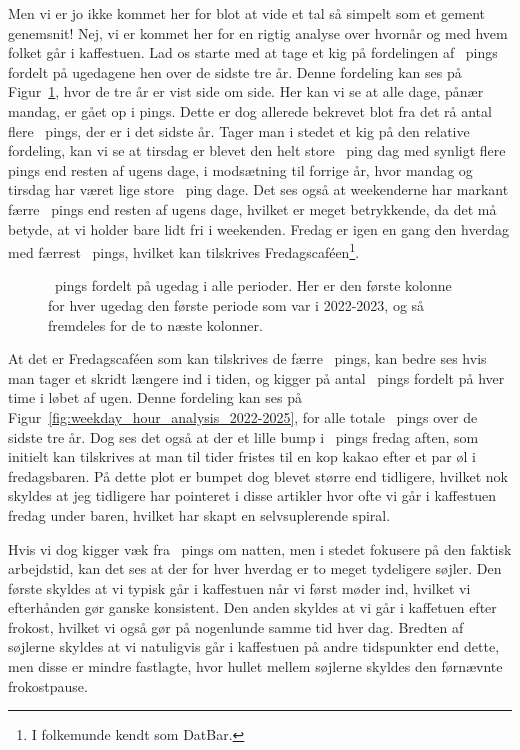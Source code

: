\begin{article}
Men vi er jo ikke kommet her for blot at vide et tal så simpelt som et gement genemsnit! Nej, vi er kommet her for en rigtig analyse over hvornår og med hvem folket går i kaffestuen.
Lad os starte med at tage et kig på fordelingen af \coffee\ pings fordelt på ugedagene hen over de sidste tre år. Denne fordeling kan ses på Figur~\ref{fig:weekday_analysis_multi}, hvor de tre år er vist side om side.
Her kan vi se at alle dage, pånær mandag, er gået op i pings. Dette er dog allerede bekrevet blot fra det
rå antal flere \coffee\ pings, der er i det sidste år.
Tager man i stedet et kig på den relative fordeling, kan vi se at tirsdag er blevet den helt store \coffee\ ping dag med synligt flere pings end resten af ugens dage, i modsætning til forrige år, hvor mandag og tirsdag har været lige store \coffee\ ping dage.
Det ses også at weekenderne har markant færre \coffee\ pings end resten af ugens dage, hvilket er meget betrykkende, da det må betyde, at vi holder bare lidt fri i weekenden.
Fredag er igen en gang den hverdag med færrest \coffee\ pings, hvilket kan tilskrives Fredagscaféen\footnote{I folkemunde kendt som DatBar.}.

\begin{figure}[H]
	\centering
	\resizebox{\columnwidth}{!}{}
	\vspace{-25pt}
	\caption{\protect\coffee\ pings fordelt på ugedag i alle perioder. Her er den første kolonne for hver ugedag den første periode som var i 2022-2023, og så fremdeles for de to næste kolonner.}
	\label{fig:weekday_analysis_multi}
\end{figure}

At det er Fredagscaféen som kan tilskrives de færre \coffee\ pings, kan bedre ses hvis man tager et skridt længere ind i tiden, og kigger på antal \coffee\ pings fordelt på hver time i løbet af ugen. Denne fordeling kan ses på Figur~\ref{fig:weekday_hour_analysis_2022-2025}, for alle totale \coffee\ pings over de sidste tre år.
Dog ses det også at der et lille bump i \coffee\ pings fredag aften, som initielt kan tilskrives at man til tider fristes til en kop kakao efter et par øl i fredagsbaren. På dette plot er bumpet dog blevet større end tidligere, hvilket nok skyldes at jeg tidligere har pointeret i disse artikler hvor ofte vi går i kaffestuen fredag under baren, hvilket har skapt en selvsuplerende spiral.

Hvis vi dog kigger væk fra \coffee\ pings om natten, men i stedet fokusere på den faktisk arbejdstid, kan det ses at der for hver hverdag er to meget tydeligere søjler. Den første skyldes at vi typisk går i kaffestuen når vi først møder ind, hvilket vi efterhånden gør ganske konsistent. Den anden skyldes at vi går i kaffetuen efter frokost, hvilket vi også gør på nogenlunde samme tid hver dag. Bredten af søjlerne skyldes at vi natuligvis går i kaffestuen på andre tidspunkter end dette, men disse er mindre fastlagte, hvor hullet mellem søjlerne skyldes den førnævnte frokostpause.


\end{article}
